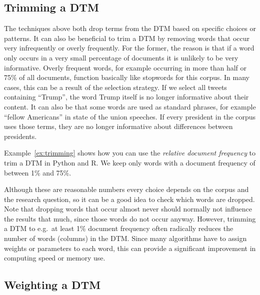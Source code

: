 \subsection{Trimming a DTM}\label{sec:trimdtm}

The techniques above both drop terms from the DTM based on specific choices or patterns.
It can also be beneficial to trim a DTM by removing words that occur very infrequently or overly frequently.
For the former, the reason is that if a word only occurs in a very small percentage of documents it is unlikely to be very informative.
Overly frequent words, for example occurring in more than half or 75\% of all documents, function basically like stopwords for this corpus.
In many cases, this can be a result of the selection strategy. If we select all tweets containing ``Trump'', the word Trump itself is no longer informative about their content.
It can also be that some words are used as standard phrases, for example ``fellow Americans'' in state of the union speeches.
If every president in the corpus uses those terms, they are no longer informative about differences between presidents.


Example~\ref{ex:trimming} shows how you can use the \emph{relative document frequency} to trim a DTM in Python and R.
We keep only words with a document frequency of between 1\% and 75\%.

Although these are reasonable numbers every choice depends on the corpus and the research question, so it can be a good idea to check which words are dropped.
Note that dropping words that occur almost never should normally not influence the results that much, since those words do not occur anyway.
However, trimming a DTM to e.g.\ at least 1\% document frequency often radically reduces the number of words (columns) in the DTM.
Since many algorithms have to assign weights or parameters to each word, this can provide a significant improvement in computing speed or memory use.

\subsection{Weighting a DTM}\label{sec:dtmweight}

